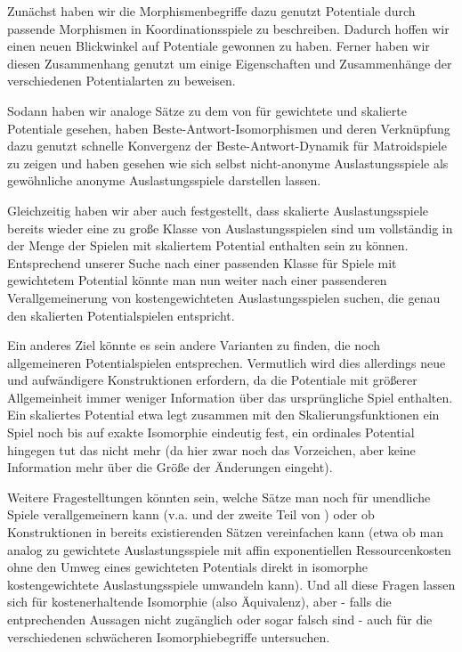\documentclass[a4paper,ngerman,11pt,bibliography=totoc]{scrartcl}
\theoremstyle{definition}
\theoremstyle{plain}
\theoremstyle{remark}
\begin{document}
Zunächst haben wir die Morphismenbegriffe dazu genutzt Potentiale durch passende Morphismen in Koordinationsspiele zu beschreiben. Dadurch hoffen wir einen neuen Blickwinkel auf Potentiale gewonnen zu haben. Ferner haben wir diesen Zusammenhang genutzt um einige Eigenschaften und Zusammenhänge der verschiedenen Potentialarten zu beweisen.

Sodann haben wir analoge Sätze zu dem von \citeauthor{MonShap} für gewichtete und skalierte Potentiale gesehen, haben Beste-Antwort-Isomorphismen und deren Verknüpfung dazu genutzt schnelle Konvergenz der Beste-Antwort-Dynamik für Matroidspiele zu zeigen und haben gesehen wie sich selbst nicht-anonyme Auslastungsspiele als gewöhnliche anonyme Auslastungsspiele darstellen lassen.

Gleichzeitig haben wir aber auch festgestellt, dass skalierte Auslastungsspiele bereits wieder eine zu große Klasse von Auslastungsspielen sind um vollständig in der Menge der Spielen mit skaliertem Potential enthalten sein zu können. Entsprechend unserer Suche nach einer passenden Klasse für Spiele mit gewichtetem Potential könnte man nun weiter nach einer passenderen Verallgemeinerung von kostengewichteten Auslastungsspielen suchen, die genau den skalierten Potentialspielen entspricht. 

Ein anderes Ziel könnte es sein andere Varianten zu finden, die noch allgemeineren Potentialspielen entsprechen. Vermutlich wird dies allerdings neue und aufwändigere Konstruktionen erfordern, da die Potentiale mit größerer Allgemeinheit immer weniger Information über das ursprüngliche Spiel enthalten. Ein skaliertes Potential etwa legt zusammen mit den Skalierungsfunktionen ein Spiel noch bis auf exakte Isomorphie eindeutig fest, ein ordinales Potential hingegen tut das nicht mehr (da hier zwar noch das Vorzeichen, aber keine Information mehr über die Größe der Änderungen eingeht).

Weitere Fragestelltungen könnten sein, welche Sätze man noch für unendliche Spiele verallgemeinern kann (v.a.  und der zweite Teil von ) oder ob Konstruktionen in bereits existierenden Sätzen vereinfachen kann (etwa ob man analog zu  gewichtete Auslastungsspiele mit affin exponentiellen Ressourcenkosten ohne den Umweg eines gewichteten Potentials direkt in isomorphe kostengewichtete Auslastungsspiele umwandeln kann). Und all diese Fragen lassen sich für kostenerhaltende Isomorphie (also Äquivalenz), aber - falls die entprechenden Aussagen nicht zugänglich oder sogar falsch sind - auch für die verschiedenen schwächeren Isomorphiebegriffe untersuchen.

\newpage
\printbibliography
\end{document}

